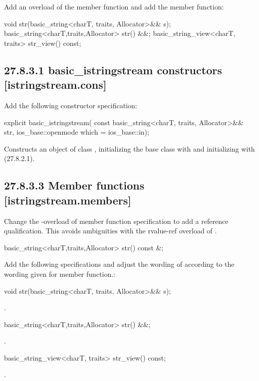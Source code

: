 \documentclass[ebook,11pt,article]{memoir}
\begin{document}
Add an overload of the  member function and add the  member function:
\begin{codeblock}
void str(basic_string<charT, traits, Allocator>&& s);
basic_string<charT,traits,Allocator> str() &&;
basic_string_view<charT, traits> str_view() const;
\end{codeblock}

\subsection{27.8.3.1 basic\_istringstream constructors [istringstream.cons]}
Add the following constructor specification:
\begin{itemdecl}
explicit basic_istringstream(
  const basic_string<charT, traits, Allocator>&& str,
  ios_base::openmode which = ios_base::in);
\end{itemdecl}
\begin{itemdescr}
\pnum
\effects Constructs an object of class , initializing the base class with  and initializing  with  (27.8.2.1).
\end{itemdescr}
\subsection{27.8.3.3 Member functions [istringstream.members]}
Change the -overload of  member function specification to add a reference qualification. This avoids ambiguities with the rvalue-ref overload of .  
\begin{codeblock}
basic_string<charT,traits,Allocator> str() const &;
\end{codeblock}

Add the following specifications and adjust the wording of  according to the wording given for  member function.:
\begin{itemdecl}
void str(basic_string<charT, traits, Allocator>&& s);
\end{itemdecl}
\begin{itemdescr}
\pnum
\effects {}.
\end{itemdescr}
\begin{itemdecl}
basic_string<charT,traits,Allocator> str() &&;
\end{itemdecl}
\begin{itemdescr}
\pnum
\returns {}.
\end{itemdescr}
\begin{itemdecl}
basic_string_view<charT, traits> str_view() const;
\end{itemdecl}
\begin{itemdescr}
\pnum
\returns {}.
\end{itemdescr}
\end{document}
